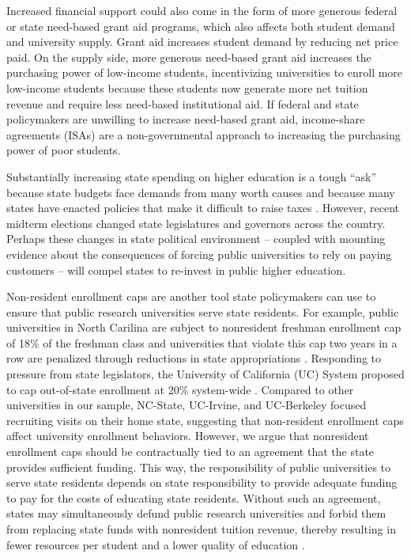 \documentclass[twoside]{article}
\begin{document}
Increased financial support could also come in the form of more generous federal or state need-based grant aid programs, which also affects both student demand and university supply. Grant aid increases student demand by reducing net price paid.  On the supply side, more generous need-based grant aid increases the purchasing power of low-income students, incentivizing universities to enroll more low-income students because these students now generate more net tuition revenue and require less need-based institutional aid. If federal and state policymakers are unwilling to increase need-based grant aid, income-share agreements (ISAs) are a non-governmental approach to increasing the purchasing power of poor students.

Substantially increasing state spending on higher education is a tough ``ask'' because state budgets face demands from many worth causes \citep{RN1652} and because many states have enacted policies that make it difficult to raise taxes \citep{RN1646}.  However, recent midterm elections changed state legislatures and governors across the country.  Perhaps these changes in state political environment -- coupled with mounting evidence about the consequences of forcing public universities to rely on paying customers -- will compel states to re-invest in public higher education.

Non-resident enrollment caps are another tool state policymakers can use to ensure that public research universities serve state residents.  For example, public universities in North Carilina are subject to nonresident freshman enrollment cap of 18\% of the freshman class and universities that violate this cap two years in a row are penalized through reductions in state appropriations \citep{RN4424}. Responding to pressure from state legislators, the  University of California (UC) System proposed to cap out-of-state enrollment at 20\% system-wide \citep{RN4247}. Compared to other universities in our sample, NC-State, UC-Irvine, and UC-Berkeley focused recruiting visits on their home state, suggesting that non-resident enrollment caps affect university enrollment behaviors. However, we argue that nonresident enrollment caps should be contractually tied to an agreement that the state provides sufficient funding. This way, the responsibility of public universities to serve state residents depends on state responsibility to provide adequate funding to pay for the costs of educating state residents.  Without such an agreement, states may simultaneously defund public research universities and forbid them from replacing state funds with nonresident tuition revenue, thereby resulting in fewer resources per student and a lower quality of education \citep{RN532}.
\end{document}
